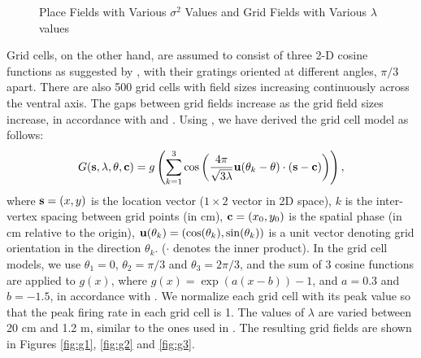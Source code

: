 \documentclass[11pt, letterpaper, onecolumn]{article}
\newcommand{\cv}{{\bf c}}
\newcommand{\sv}{{\bf s}}
\newcommand{\uv}{{\bf u}}
\begin{document}
\begin{figure}[ht]
\centering
{}
\caption{Place Fields with Various $ \sigma^{2} $ Values and Grid Fields with Various $ \lambda $ values}
\label{fig:places}
\end{figure}

Grid cells, on the other hand, are assumed to consist of three 2-D cosine functions as suggested by \cite{Solstad:From06}, with their gratings oriented at different angles, $ \pi/3 $ apart. There are also 500 grid cells with field sizes increasing continuously across the ventral axis. The gaps between grid fields increase as the grid field sizes increase, in  accordance with \cite{Brun:Progressive08} and \cite{Hafting:Microstructure05}. Using \cite{Lyttle:Spatial13}, we have derived the grid cell model as follows:
\begin{equation}
\label{eq:gridprob}
G(\sv, \lambda, \theta, \cv) = g\left(\sum_{k=1}^{3} \cos\left(\frac{4\pi}{\sqrt{3\lambda}}\uv(\theta_{k}-\theta)\cdot(\sv-\cv)\right)\right),
\end{equation}
where $ \sv=(x,y)$ is the location vector ($1\times 2$ vector in 2D space), $ k $ is the inter-vertex spacing between grid points (in cm), $ \cv = (x_{0},y_{0}) $ is the spatial phase (in cm relative to the origin), $ \uv(\theta_{k})=(\cos(\theta_{k}), \sin(\theta_{k}))$ is a unit vector denoting grid orientation in the direction $ \theta_{k} $. ($\cdot$ denotes the inner product). In the grid cell models, we use $ \theta_{1} = 0 $, $ \theta_{2} = \pi/3 $ and $ \theta_{3} = 2\pi/3 $, and the sum of 3 cosine functions are applied to $ g(x) $, where $ g(x) = \exp(a(x-b))-1 $, and $ a=0.3 $ and $ b=-1.5 $, in accordance with \cite{Almeida:input09}. We normalize each grid cell with its peak value so that the peak firing rate in each grid cell is 1. The values of $ \lambda $ are varied between 20 cm and 1.2 m, similar to the ones used in \cite{Moser:Grid14}. The resulting grid fields are shown in Figures \ref{fig:g1}, \ref{fig:g2} and \ref{fig:g3}.
\end{document}
